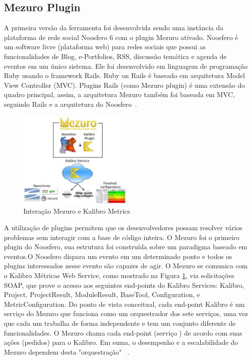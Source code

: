 \subsection{Mezuro Plugin}
\label{mezuro-plugin}
A primeira versão da ferramenta foi desenvolvida sendo uma instância da plataforma de rede social Noosfero 6 com o plugin Mezuro ativado. Noosfero é um software livre (plataforma web) para redes sociais que possui as funcionalidades de Blog, e-Portfolios, RSS, discussão temática e agenda de eventos em um único sistema. Ele foi desenvolvido em linguagem de programação Ruby usando o framework Rails. Ruby on Rails é baseado em arquitetura Model View Controller (MVC). Plugins Rails (como Mezuro plugin) é uma extensão do quadro principal, assim, a arquitetura Mezuro também foi baseada em MVC, seguindo Rails e a arquitetura do Noosfero~\cite{mezuro2012}.

\begin{figure}[H]
  \begin{center}
    \includegraphics[width=0.5\textwidth]{figuras/arquitetura.eps}
    \caption{Interação Mezuro e Kalibro Metrics}
    \label{fig:arquitetura}
  \end{center}
\end{figure}

A utilização de plugins permitem que os desenvolvedores possam resolver 
vários problemas sem interagir com a base de código inteira. O Mezuro foi 
o primeiro plugin do Noosfero, sua estrutura foi construída sobre um 
paradigma baseado em eventos.O Noosfero dispara um evento em um 
determinado ponto e todos os plugins interessados nesse evento são 
capazes de agir. O Mezuro se comunica com o Kalibro Métricas Web Service, 
como mostrado na Figura \ref{fig:arquitetura}, via solicitações SOAP, que 
prove o acesso aos seguintes end-points do Kalibro Services: Kalibro,
Project, ProjectResult, ModuleResult, BaseTool, Configuration, e 
MetricConfiguration. Do ponto de vista conceitual, cada end-point Kalibro 
é um serviço do Mezuro que funciona como um orquestrador dos sete 
serviços, uma vez que cada um trabalha de forma independente e tem um 
conjunto diferente de funcionalidades. O Mezuro chama cada end-point 
(serviço ) de acordo com suas ações (pedidos) para o Kalibro. Em suma, o 
desempenho e a escalabilidade do Mezuro dependem desta "orquestração" ~\cite{mezuro2012}.

